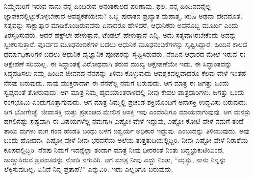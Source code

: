 ನಿಮ್ಮೆದುರಿಗೆ ಇರುವ ನಾನು ನನ್ನ ಹಿಂದಿರುವ ಅನಂತಕಾಲದ ಪರಿಣಾಮ, ಫಲ. ನನ್ನ ಹಿಂದಿನದನ್ನೆಲ್ಲ ಜ್ಞಾಪಕದಲ್ಲಿಟ್ಟುಕೊಳ್ಳಬೇಕಾದ ಆವಶ್ಯಕತೆಯೇನು? ಒಬ್ಬ ಪುರಾತನ ಪ್ರಖ್ಯಾತ ಮಹಾತ್ಮ, ಋಷಿ ಅಥವಾ ದೇವದೂತ, ಸತ್ಯವನ್ನು ಸಾಕ್ಷಾತ್ಕಾರ ಮಾಡಿಕೊಂಡಿರುವವನು ಏನಾದರೂ ಹೇಳಿದರೆ, ಆಧುನಿಕರು ಅವನೊಬ್ಬ ಮೂರ್ಖ ಎಂದು ತಿರಸ್ಕರಿಸುವರು. ಆದರೆ ಹಕ್ಸ್​ಲೇ ಹೇಳುತ್ತಾನೆ, ಟೆಂಡಲ್​ ಹೇಳುತ್ತಾನೆ ಎನ್ನಿ. ಅದು ಸತ್ಯವಾಗಿರಬೇಕೆಂದು ಅದನ್ನು ಸ್ವೀಕರಿಸುತ್ತಾರೆ. ಪೂರ್ವದ ಮೂಢನಂಬಿಕೆಗಳ ಬದಲು ಆಧುನಿಕ ಮೂಢನಂಬಿಕೆಗಳನ್ನು ಸೃಷ್ಟಿಸಿದ್ದಾರೆ. ಹಿಂದಿನ ಕಾಲದ ಧರ್ಮಾಧಿಕಾರಿಗಳ ಬದಲು ಆಧುನಿಕ ವೈಜ್ಞಾನಿಕ ಪೋಪರನ್ನು ಸೃಷ್ಟಿಸಿರುವರು. ನೆನಪಿನ ಆಧಾರದ ಮೇಲೆ ಇರುವ ಈ ಆಕ್ಷೇಪಣೆ ಸರಿಯಲ್ಲ. ಈ ಸಿದ್ಧಾಂತಕ್ಕೆ ವಿರೋಧವಾಗಿ ತರುವ ಮುಖ್ಯ ಆಕ್ಷೇಪಣೆಯೇ ಇದು. ಈ ಸಿದ್ಧಾಂತವನ್ನು ಸಿದ್ಧಪಡಿಸಲು ನಮ್ಮ ಹಿಂದಿನ ಜೀವನದ ನೆನಪನ್ನು ತಿಳಿದು ಕೊಳ್ಳುವುದು ಆವಶ್ಯಕವಲ್ಲವಾದರೂ ಕೆಲವು ವೇಳೆ ಇಂತಹ ನೆನಪು ಬರುವುದು. ನಾವು ಮುಕ್ತರಾದಾಗ ಈ ನೆನಪೆಲ್ಲ ನಮಗೆ ಬರುವುದು. ಆಗ ಮಾತ್ರ ಈ ಜಗತ್ತು ಒಂದು ಸ್ವಪ್ನದಂತೆ ತೋರುವುದು. ಆಗ ಮಾತ್ರ ನಿಮ್ಮ ಹೃದಯಾಂತರಾಳದಲ್ಲಿ ನೀವು ಕೇವಲ ಪಾತ್ರಧಾರಿಗಳು, ಜಗತ್ತು ಒಂದು ರಂಗಭೂಮಿ ಎಂದುಗೊತ್ತಾಗುವುದು. ಆಗ ಮಾತ್ರ ನಿಮ್ಮಲ್ಲಿ ಪ್ರಚಂಡ ಶಕ್ತಿಯೊಂದಿಗೆ ಅನಾಸಕ್ತಿ ಉದ್ಭವಿಸು ಬರುವುದು. ಆಗ ಭೋಗೇಚ್ಛೆ, ಜೀವಾಸಕ್ತಿ ಮತ್ತು ಪ್ರಪಂಚದ ಮೇಲಿನ ಆಸಕ್ತಿ ಇವು ಎಂದೆಂದಿಗೂ ಮಾಯವಾಗುವುವು. ಆಗ ಮನಸ್ಸು ಹಗಲಿನಷ್ಟು ಸ್ಪಷ್ಟವಾಗಿ ಈ ವಿಷಯಗಳೆಲ್ಲ ನಮಗಾಗಿ ಎಷ್ಟೋ ವೇಳೆ ಇದ್ದುವು, ಎಷ್ಟೋ ಕೋಟಿ ವೇಳೆ ನಮಗೆ ತಂದೆ ತಾಯಿ ಮಗಳು ಮಗ ಗಂಡ ಹೆಂಡತಿ ಬಂಧು ಬಳಗ ಐಶ್ವರ್ಯ ಅಧಿಕಾರ ಇದ್ದುವು. ಎಂಬುದನ್ನು ತಿಳಿಯುವುದು. ಅವು ಬಂದು ಹೋದವು. ಎಷ್ಟೋ ವೇಳೆ ನೀವು ಭರವಸೆಯ ಅಲೆಯ ತುತ್ತತುದಿಯಲ್ಲಿದ್ದಿರಿ. ನೀವು ಎಷ್ಟೋ ವೇಳೆ ನಿರಾಶೆಯ ಕೂಪದಲ್ಲಿದ್ದಿರಿ. ನೆನಪು ನಿಮಗೆ ಇದನ್ನೆಲ್ಲಾ ತಂದಾಗ ಮಾತ್ರ ನೀವು ಧೀರರಂತೆ ನಿಂತು ಬದ್ಧಭ್ರುಕುಟಿಯಿಂದ, ಚುಚ್ಚುತ್ತಿರುವ ಪ್ರಪಂಚವನ್ನು ನೋಡಿ ನಗುವಿರಿ. ಆಗ ಮಾತ್ರ ನೀವು ಎದ್ದು ನಿಂತು, “ಮೃತ್ಯು, ನಾನು ನಿನ್ನನ್ನು ಲೆಕ್ಕಿಸುವುದಿಲ್ಲ. ಏನಿದೆ ನಿನ್ನ ಪ್ರತಾಪ?” ಎನ್ನುವಿರಿ. ಇದು ಎಲ್ಲರಿಗೂ ಬರುವುದು.

